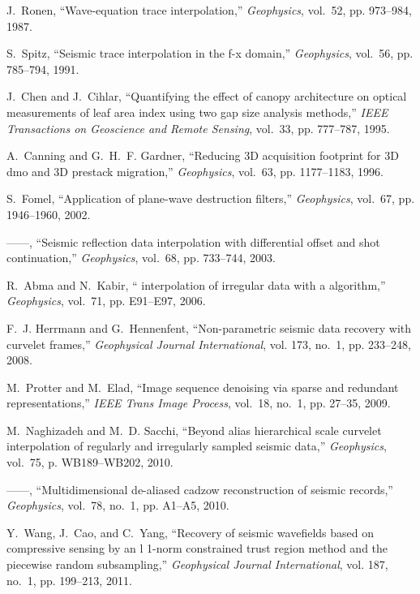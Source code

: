 \begin{thebibliography}{00}
J.~Ronen, ``Wave-equation trace interpolation,'' \emph{Geophysics}, vol.~52,
  pp. 973--984, 1987.

S.~Spitz, ``Seismic trace interpolation in the f-x domain,'' \emph{Geophysics},
  vol.~56, pp. 785--794, 1991.

J.~Chen and J.~Cihlar, ``Quantifying the effect of canopy architecture on
  optical measurements of leaf area index using two gap size analysis
  methods,'' \emph{IEEE Transactions on Geoscience and Remote Sensing},
  vol.~33, pp. 777--787, 1995.

A.~Canning and G.~H.~F. Gardner, ``Reducing 3{D} acquisition footprint for 3{D}
  dmo and 3{D} prestack migration,'' \emph{Geophysics}, vol.~63, pp.
  1177--1183, 1996.

S.~Fomel, ``Application of plane-wave destruction filters,'' \emph{Geophysics},
  vol.~67, pp. 1946--1960, 2002.

------, ``Seismic reflection data interpolation with differential offset and
  shot continuation,'' \emph{Geophysics}, vol.~68, pp. 733--744, 2003.

R.~Abma and N.~Kabir, `` interpolation of irregular data with a
   algorithm,'' \emph{Geophysics}, vol.~71, pp. E91--E97, 2006.

F.~J. Herrmann and G.~Hennenfent, ``Non-parametric seismic data recovery with
  curvelet frames,'' \emph{Geophysical Journal International}, vol. 173, no.~1,
  pp. 233--248, 2008.

M.~Protter and M.~Elad, ``Image sequence denoising via sparse and redundant
  representations,'' \emph{IEEE Trans Image Process}, vol.~18, no.~1, pp.
  27--35, 2009.

M.~Naghizadeh and M.~D. Sacchi, ``Beyond alias hierarchical scale curvelet
  interpolation of regularly and irregularly sampled seismic data,''
  \emph{Geophysics}, vol.~75, p. WB189–WB202, 2010.

------, ``Multidimensional de-aliased cadzow reconstruction of seismic
  records,'' \emph{Geophysics}, vol.~78, no.~1, pp. A1--A5, 2010.

Y.~Wang, J.~Cao, and C.~Yang, ``Recovery of seismic wavefields based on
  compressive sensing by an l 1-norm constrained trust region method and the
  piecewise random subsampling,'' \emph{Geophysical Journal International},
  vol. 187, no.~1, pp. 199--213, 2011.


\end{thebibliography}
